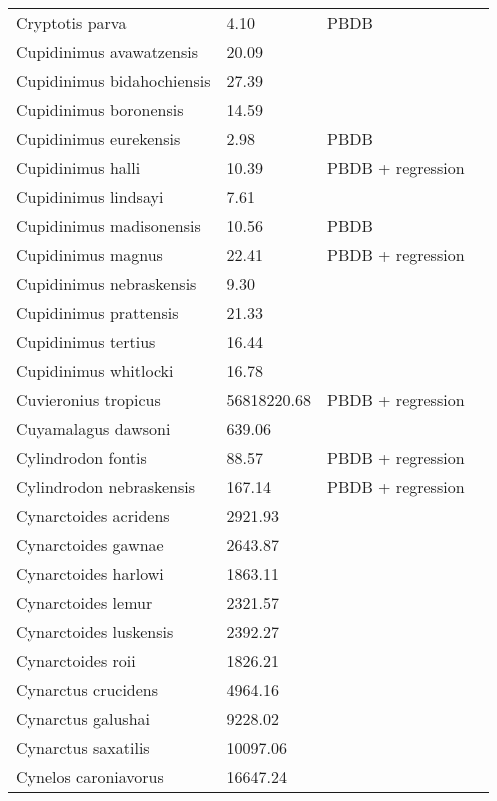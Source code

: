 \documentclass{article}
\begin{document}
\begin{center}
\begin{longtable}{p{} p{} p{} p{}}
    Cryptotis parva & 4.10 & PBDB &  \\ 
    Cupidinimus avawatzensis & 20.09 & \cite{Tomiya2013} &  \\ 
    Cupidinimus bidahochiensis & 27.39 & \cite{Tomiya2013} &  \\ 
    Cupidinimus boronensis & 14.59 & \cite{Tomiya2013} &  \\ 
    Cupidinimus eurekensis & 2.98 & PBDB &  \\ 
    Cupidinimus halli & 10.39 & PBDB + regression &  \\ 
    Cupidinimus lindsayi & 7.61 & \cite{Tomiya2013} &  \\ 
    Cupidinimus madisonensis & 10.56 & PBDB &  \\ 
    Cupidinimus magnus & 22.41 & PBDB + regression &  \\ 
    Cupidinimus nebraskensis & 9.30 & \cite{Tomiya2013} &  \\ 
    Cupidinimus prattensis & 21.33 & \cite{Tomiya2013} &  \\ 
    Cupidinimus tertius & 16.44 & \cite{Tomiya2013} &  \\ 
    Cupidinimus whitlocki & 16.78 & \cite{Tomiya2013} &  \\ 
    Cuvieronius tropicus & 56818220.68 & PBDB + regression &  \\ 
    Cuyamalagus dawsoni & 639.06 & \cite{Tomiya2013} &  \\ 
    Cylindrodon fontis & 88.57 & PBDB + regression &  \\ 
    Cylindrodon nebraskensis & 167.14 & PBDB + regression &  \\ 
    Cynarctoides acridens & 2921.93 & \cite{Tomiya2013} &  \\ 
    Cynarctoides gawnae & 2643.87 & \cite{Tomiya2013} &  \\ 
    Cynarctoides harlowi & 1863.11 & \cite{Tomiya2013} &  \\ 
    Cynarctoides lemur & 2321.57 & \cite{Tomiya2013} &  \\ 
    Cynarctoides luskensis & 2392.27 & \cite{Tomiya2013} &  \\ 
    Cynarctoides roii & 1826.21 & \cite{Tomiya2013} &  \\ 
    Cynarctus crucidens & 4964.16 & \cite{Tomiya2013} &  \\ 
    Cynarctus galushai & 9228.02 & \cite{Tomiya2013} &  \\ 
    Cynarctus saxatilis & 10097.06 & \cite{Tomiya2013} &  \\ 
    Cynelos caroniavorus & 16647.24 & \cite{Tomiya2013} &  \\ 

\end{longtable}
\end{center}
\end{document}
